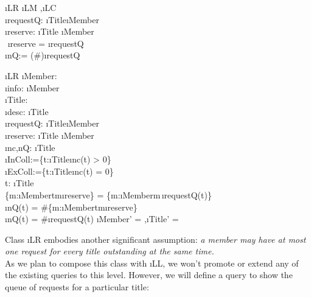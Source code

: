 \documentclass[12pt,a4paper]{article}
\begin{document}
\begin{showspecs}
	\begin{spec}{\i{LR}}
		\i{LM} \sep \i{LC}\\[0.5ex]
		\i{requestQ}: \i{Title}\tfun{}\cdot{}\;\i{Member}\\[0.5ex]
		\i{reserve}: \i{Title} \prel \i{Member}\\
		\,\,\i{reserve} = \circ\i{requestQ}\\
		\i{nQ}:= (\#)\circ\i{requestQ}
	\end{spec}
\end{showspecs}
\begin{showspecs}
	\begin{spec}[\equiv]{\i{LR}}
		\i{Member}: \;\\
		\i{info}: \i{Member} \tfun {}\\[0.5ex]
		\i{Title}: \;\\
		\i{desc}: \i{Title} \tfun {}\\[0.5ex]
		\i{requestQ}: \i{Title}\tfun{}\cdot{}\;\i{Member}\\
		\i{reserve}: \i{Title} \prel \i{Member}\\
		\i{nc,nQ}: \i{Title} \tfun {}\\[0.5ex]
		\i{InColl}:=\!\{t\!:\!\i{Title}\bullet\i{nc}(t) > 0\}\\
		\i{ExColl}\!:=\!\{t\!:\!\i{Title}\bullet\i{nc}(t) = 0\}\\[0.5ex]
		\forall t: \i{Title}\, \bullet \\
        \hspace{0.5cm}\{m:\i{Member}\bullet t\mapsto m\in \i{reserve}\} = \{m:\i{Member}\bullet m\in {}\,\i{requestQ}(t)\}\,\wedge\\
		\hspace{0.5cm}\i{nQ}(t) = \#\{m:\i{Member}\bullet t\mapsto m\in \i{reserve}\}\,\wedge\\
        \hspace{0.5cm}\i{nQ}(t) = \#\i{requestQ}(t)
	\post	\i{Member'} = \emptyset \sep \i{Title'} = \emptyset
	\end{spec}
\end{showspecs}

\medskip\noindent Class \i{LR} embodies another significant assumption:
\emph{a member may have at most one request for every title outstanding at the same time.}\\

\noindent As we plan to compose this class with \i{LL}, we won't promote or extend any of the existing queries to this level.
However, we will define a query to show the queue of requests for a particular title:
\end{document}
